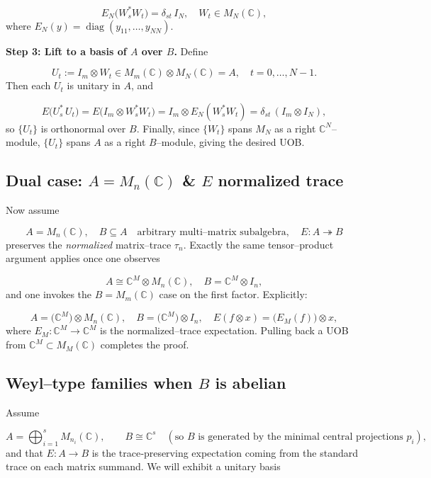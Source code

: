 \documentclass[11pt]{article}
\theoremstyle{mytheoremstyle}
\theoremstyle{definition}
\theoremstyle{remark}
\newcommand{\bbC}{\mathbb{C}}
\begin{document}
\[
  E_N\bigl(W_s^*W_t\bigr)
  =\delta_{st}\,I_N, \quad
  W_t\in M_N(\bbC),
\]
where \(E_N(y)=\operatorname{diag}(y_{11},\dots,y_{NN})\).

\medskip
\noindent\textbf{Step 3: Lift to a basis of \(A\) over \(B\).} Define

\[
  U_t := I_m \otimes W_t
  \in M_m(\bbC)\otimes M_N(\bbC)=A, \quad
  t=0,\dots,N-1.
\]
Then each \(U_t\) is unitary in \(A\), and

\[
  E\bigl(U_s^*\,U_t\bigr)
  =E\bigl(I_m\otimes W_s^*W_t\bigr)
  =I_m\otimes E_N(W_s^*W_t)
  =\delta_{st}\,(I_m\otimes I_N),
\]
so \(\{U_t\}\) is orthonormal over \(B\).  Finally, since \(\{W_t\}\)
spans \(M_N\) as a right \(\bbC^N\)–module, \(\{U_t\}\)
spans \(A\) as a right \(B\)–module, giving the desired UOB.

\bigskip
\subsection{Dual case: $A=M_n(\bbC)$ \& $E$ normalized trace}
\label{sec:simple-corner-A}

Now assume

\[
  A=M_n(\bbC),
  \quad
  B\subseteq A
  \quad\text{arbitrary multi–matrix subalgebra}, \quad
  E\colon A\twoheadrightarrow B
\]
preserves the \emph{normalized} matrix–trace \(\tau_n\).  Exactly the same
tensor–product argument applies once one observes

\[
  A\cong\bbC^M\otimes M_n(\bbC), \quad
  B=\bbC^M\otimes I_n,
\]
and one invokes the $B=M_m(\bbC)$ case on the first factor.  Explicitly:

\[
A =\bigl(\bbC^M\bigr)\otimes M_n(\bbC),
 \quad
 B =\bigl(\bbC^M\bigr)\otimes I_n, \quad
 E(f\otimes x)
 =\bigl(E_M(f)\bigr)\otimes x,
\]
where \(E_M\colon \bbC^M\to\bbC^M\) is the normalized–trace expectation.
Pulling back a UOB from \(\bbC^M\subset M_M(\bbC)\) completes the proof.
\hfill\qedsymbol


\subsection{Weyl–type families when $B$ is abelian}
\label{sec:weyl}

Assume

\[
  A = \bigoplus_{i=1}^{s} M_{n_i}(\mathbb{C}), \qquad
  B \cong\bbC^s
  \quad(\text{so $B$ is generated by the minimal central projections }p_i),
\]
and that $E\colon A\to B$ is the trace‐preserving expectation coming from the
standard trace on each matrix summand.  We will exhibit a unitary basis
\end{document}

